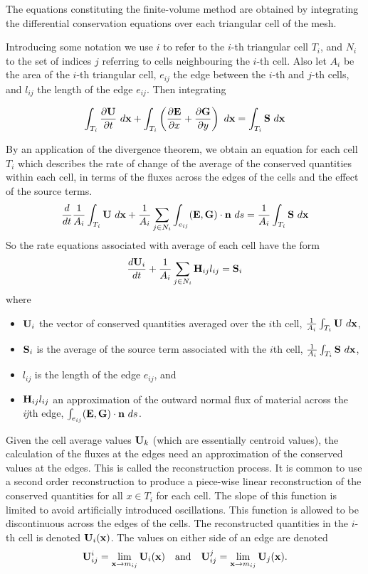 \documentclass{manual}
\begin{document}
The equations constituting the finite-volume method are obtained by
integrating the differential conservation equations over each
triangular cell of the mesh. 

Introducing some notation we use $i$ to
refer to the $i$-th triangular cell $T_i$, and $N_i$ to the
set of indices $j$ referring to cells neighbouring the $i$-th cell.
Also let $A_i$ be the area of the $i$-th triangular cell, $e_{ij}$ the edge between the 
 $i$-th and $j$-th  cells, and $l_{ij}$ 
the length of the edge $e_{ij}$. Then integrating 

\[
\int_{T_i} \frac{\partial \mathbf{U}}{\partial t} \ d\mathbf{x} + \int_{T_i} \left( \frac{\partial \mathbf{E}}{\partial
x}+\frac{\partial \mathbf{G}}{\partial y} \right)  \ d\mathbf{x} =  \int_{T_i} \mathbf{S}   \ d\mathbf{x} 
\]

By an application of the divergence theorem, we obtain an equation for each cell $T_i$ 
which describes the rate of change of the average of the
conserved quantities within each cell, in terms of the fluxes across
the edges of the cells and the effect of the source terms.
\[
 \frac{d }{d t} \frac1{A_i} \int_{T_i}  \UU \ d\xx +  \frac1{A_i}  \sum_{j \in N_i} \int_{e_{ij}}  (\EE,  \GG) \cdot \nn  \ ds =  \frac1{A_i} \int_{T_i} \SSS   \ d\xx 
\]
So the rate equations associated with average of each cell have the form
\[
 \frac{d\mathbf{U}_i }{dt}+ \frac1{A_i}\sum\limits_{j\in N_i} \mathbf{H}_{ij} l_{ij} = \mathbf{S}_i
\]
where
\begin{itemize}
  \item $\mathbf{U}_i$ the vector of conserved quantities averaged over the $i$th cell, $\frac1{A_i} \int_{T_i}  \UU \ d\xx $,
  \item $\mathbf{S}_i$ is the average of the source term associated with the $i$th cell, $\frac1{A_i} \int_{T_i} \SSS   \ d\xx$, 
   \item $l_{ij}$ is the length of the edge $e_{ij}$, and
  \item $\mathbf{H}_{ij} l_{ij}$ an approximation of the outward normal flux of material across the \textit{ij}th edge, $\int_{e_{ij}}  (\EE,  \GG) \cdot \nn  \ ds$.
\end{itemize}

Given the cell average values $\mathbf{U}_k$ (which are essentially centroid values), the calculation of the fluxes at the edges need an approximation of the conserved values at the edges. This is called the reconstruction process. It is common to use a second order reconstruction to produce a piece-wise linear
reconstruction of the conserved quantities for  all $x \in
T_i$ for each cell.  The slope of this function is limited to avoid
artificially introduced oscillations.
This
function is allowed to be discontinuous across the edges of the
cells. The reconstructed quantities in the $i$-th cell is denoted $\mathbf{U}_i(\mathbf{x})$. 
The values on either side of an edge are denoted
\[
\mathbf{U}^i_{ij}  = \lim_{\mathbf{x} \rightarrow m_{ij}}  \mathbf{U}_i(\mathbf{x}) \quad\text{and}\quad
\mathbf{U}^j_{ij}  = \lim_{\mathbf{x} \rightarrow m_{ij}}  \mathbf{U}_j(\mathbf{x}) .
\]
\end{document}
